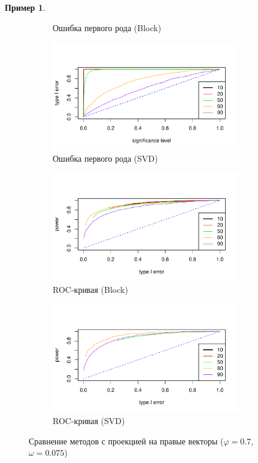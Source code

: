 \documentclass[specialist,
substylefile = spbu_report.rtx,
subf,href,colorlinks=true, 12pt]{disser}
\theoremstyle{definition}
\newtheorem{example}{Пример}
\begin{document}
\begin{example}
\begin{figure}[h!]
\begin{subfigure}[t]{0.5\textwidth}
		\caption{Ошибка первого рода (Block)}
		\label{fig:block_fa_a}
	\end{subfigure}\hspace{\fill}
	\begin{subfigure}[t]{0.5\textwidth}
		\centering
		\includegraphics[width=0.9\textwidth]{img/type1error_mssa_fa.pdf}
		\caption{Ошибка первого рода (SVD)}
	\end{subfigure}
	\bigskip
	\begin{subfigure}[t]{0.5\textwidth}
		\centering
		\includegraphics[width=0.9\textwidth]{img/roc_block_fa_omega0075.pdf}
		\caption{ROC-кривая (Block)}
		\label{fig:block_fa_r}
	\end{subfigure}\hspace{\fill}
	\begin{subfigure}[t]{0.5\textwidth}
		\centering
		\includegraphics[width=0.9\textwidth]{img/roc_mssa_fa.pdf}
		\caption{ROC-кривая (SVD)}
	\end{subfigure}
	\caption{Сравнение методов с проекцией на правые векторы ($\varphi=0.7$, $\omega=0.075$)}
	\label{fig:block_fa}
\end{figure}


\end{example}
\end{document}
